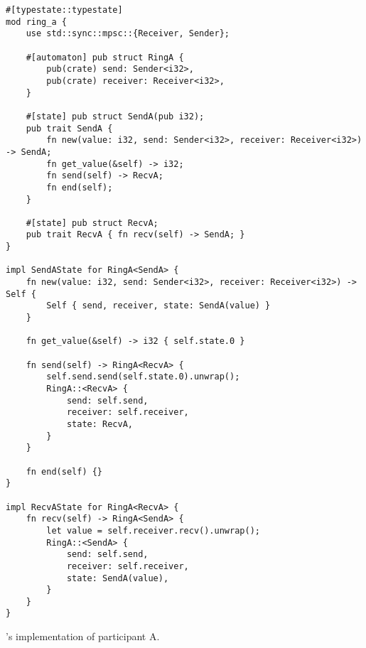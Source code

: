 \begin{listing}
    \begin{verbatim}
#[typestate::typestate]
mod ring_a {
    use std::sync::mpsc::{Receiver, Sender};

    #[automaton] pub struct RingA {
        pub(crate) send: Sender<i32>,
        pub(crate) receiver: Receiver<i32>,
    }

    #[state] pub struct SendA(pub i32);
    pub trait SendA {
        fn new(value: i32, send: Sender<i32>, receiver: Receiver<i32>) -> SendA;
        fn get_value(&self) -> i32;
        fn send(self) -> RecvA;
        fn end(self);
    }

    #[state] pub struct RecvA;
    pub trait RecvA { fn recv(self) -> SendA; }
}

impl SendAState for RingA<SendA> {
    fn new(value: i32, send: Sender<i32>, receiver: Receiver<i32>) -> Self {
        Self { send, receiver, state: SendA(value) }
    }

    fn get_value(&self) -> i32 { self.state.0 }

    fn send(self) -> RingA<RecvA> {
        self.send.send(self.state.0).unwrap();
        RingA::<RecvA> {
            send: self.send,
            receiver: self.receiver,
            state: RecvA,
        }
    }

    fn end(self) {}
}

impl RecvAState for RingA<RecvA> {
    fn recv(self) -> RingA<SendA> {
        let value = self.receiver.recv().unwrap();
        RingA::<SendA> {
            send: self.send,
            receiver: self.receiver,
            state: SendA(value),
        }
    }
}
    \end{verbatim}
    \caption{'s implementation of participant A.}
    \label{lst:typestate-ring-starter}
\end{listing}

